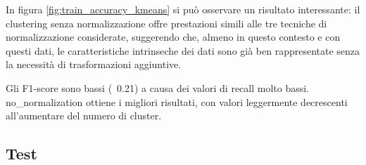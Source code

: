In figura \ref{fig:train_accuracy_kmeans} si può osservare un risultato interessante: il clustering senza normalizzazione offre prestazioni simili alle tre tecniche di normalizzazione considerate, suggerendo che, almeno in questo contesto e con questi dati, le caratteristiche intrinseche dei dati sono già ben rappresentate senza la necessità di trasformazioni aggiuntive.

\begin{table}[H]
  \centering
  \caption{Top 5 Configurazioni per Train F1-Score - Run K-Means}
\end{table}

Gli F1-score sono bassi (~0.21) a causa dei valori di recall molto bassi. no\_normalization ottiene i migliori risultati, con valori leggermente decrescenti all'aumentare del numero di cluster.

\subsection{Test}

